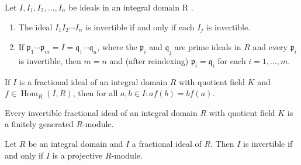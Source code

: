 \begin{lemma}
    Let $I, I_1, I_2, \ldots, I_{n}$ be ideals in an integral domain R .
    \begin{enumerate}
        \item
              The ideal $I_1 I_2 \cdots I_{n}$ is invertible if and only if each $I_{j}$ is invertible.

        \item
              If $\mathfrak{p}_1 \cdots \mathfrak{p}_{m}=I=\mathfrak{q}_1 \cdots \mathfrak{q}_{n}$, where the $\mathfrak{p}_{i}$ and $\mathfrak{q}_{j}$ are prime ideals in $R$ and every $\mathfrak{p}_{i}$ is invertible, then $m=n$ and (after reindexing) $\mathfrak{p}_{i}=\mathfrak{q}_{i}$ for each $i=1, \ldots, m$.
    \end{enumerate}
\end{lemma}






\begin{lemma}
    If $I$ is a fractional ideal of an integral domain $R$ with quotient field $K$ and $f\in \operatorname{Hom}_{R}(I, R)$, then for all $a, b \in I: af(b)=bf(a)$.
\end{lemma}

\begin{lemma}
    Every invertible fractional ideal of an integral domain $R$ with quotient field $K$ is a finitely generated $R$-module.
\end{lemma}

\begin{theorem}
    Let $R$ be an integral domain and $I$ a fractional ideal of $R$.
    Then $I$ is invertible if and only if $I$ is a projective $R$-module.
\end{theorem}



